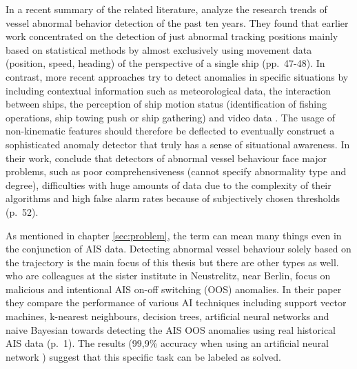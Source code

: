 \par 
In a recent summary of the related literature, \cite{zhang2020analysis} analyze the research trends of vessel abnormal behavior detection of the past ten years. They found that earlier work concentrated on the detection of just abnormal tracking positions mainly based on statistical methods by almost exclusively using movement data (position, speed, heading) of the perspective of a single ship (pp.~47-48). In contrast, more recent approaches try to detect anomalies in specific situations by including contextual information such as meteorological data, the interaction between ships, the perception of ship motion status (identification of fishing operations, ship towing push or ship gathering) and video data \cite[p.~50]{zhang2020analysis}. The usage of non-kinematic features should therefore be deflected to eventually construct a sophisticated anomaly detector that  truly has a sense of situational awareness. In their work, \cite{zhang2020analysis} conclude that detectors of abnormal vessel behaviour face major problems, such as poor comprehensiveness (cannot specify abnormality type and degree), difficulties with huge amounts of data due to the complexity of their algorithms and high false alarm rates because of subjectively chosen thresholds (p.~52).
\par 
As mentioned in chapter \ref{sec:problem}, the term  can mean many things even in the conjunction of AIS data. Detecting abnormal vessel behaviour solely based on the trajectory is the main focus of this thesis but there are other types as well. \cite{singh2020effectiveness} who are colleagues at the sister institute in Neustrelitz, near Berlin, focus on malicious and intentional AIS on-off switching (OOS) anomalies. In their paper they compare the performance of various AI techniques including support vector machines, k-nearest neighbours, decision trees, artificial neural networks and naive Bayesian towards detecting the AIS
OOS anomalies using real historical AIS data (p.~1). The results (99,9\% accuracy when using an artificial neural network \cite[p.~7]{singh2020effectiveness}) suggest that this specific task can be labeled as solved. 



